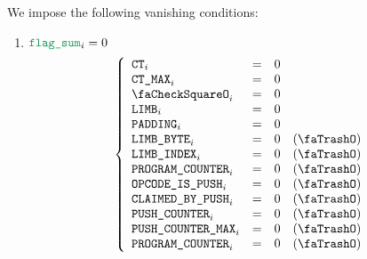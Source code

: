 We impose the following vanishing conditions:
\begin{enumerate}
    \item
	\If $\flagSum _{i} = 0$ \Then 
	\[
	    \left\{ \begin{array}{lclr}
		\ct                      _{i} & = & 0 \\
		\ctMax                   _{i} & = & 0 \\
		\done                    _{i} & = & 0 \\
		\romColumnLimb           _{i} & = & 0 \\
		\romColumnPadding        _{i} & = & 0 \\
		\romColumnLimbByte       _{i} & = & 0 & (\trash) \\
		\romColumnLimbIndex      _{i} & = & 0 & (\trash) \\
		\romColumnProgramCounter _{i} & = & 0 & (\trash) \\
		\romColumnOpcodeIsPush   _{i} & = & 0 & (\trash) \\
		\romColumnClaimedByPush  _{i} & = & 0 & (\trash) \\
		\CP                      _{i} & = & 0 & (\trash) \\
		\PP                      _{i} & = & 0 & (\trash) \\
		\romColumnProgramCounter _{i} & = & 0 & (\trash) \\
	    \end{array} \right.
	\]
\end{enumerate}
